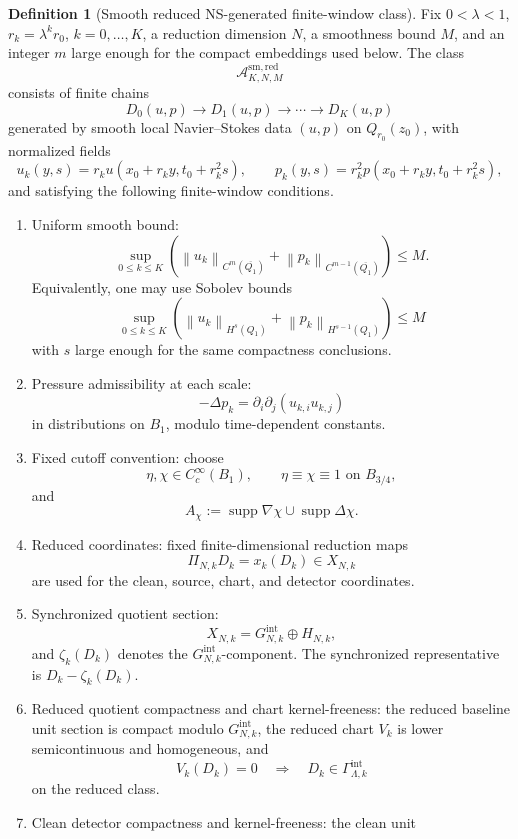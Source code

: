 \documentclass[11pt]{article}
\numberwithin{equation}{section}
\theoremstyle{plain}
\theoremstyle{definition}
\newtheorem{definition}[theorem]{Definition}
\theoremstyle{remark}
\newcommand{\intg}{\mathrm{int}}
\newcommand{\supp}{\operatorname{supp}}
\newcommand{\A}{\mathcal A}
\newcommand{\norm}[1]{\left\lVert #1\right\rVert}
\begin{document}
\begin{definition}[Smooth reduced NS-generated finite-window class]\label{def:smred-class}
Fix \(0<\lambda<1\), \(r_k=\lambda^kr_0\), \(k=0,\dots,K\), a reduction
dimension \(N\), a smoothness bound \(M\), and an integer \(m\) large enough
for the compact embeddings used below.  The class
\[
  \A_{K,N,M}^{\mathrm{sm,red}}
\]
consists of finite chains
\[
  D_0(u,p)\to D_1(u,p)\to\cdots\to D_K(u,p)
\]
generated by smooth local Navier--Stokes data \((u,p)\) on \(Q_{r_0}(z_0)\),
with normalized fields
\[
  u_k(y,s)=r_k u(x_0+r_ky,t_0+r_k^2s),
  \qquad
  p_k(y,s)=r_k^2 p(x_0+r_ky,t_0+r_k^2s),
\]
and satisfying the following finite-window conditions.
\begin{enumerate}[label=(\alph*)]
  \item Uniform smooth bound:
  \[
    \sup_{0\le k\le K}
    \left(
      \norm{u_k}_{C^m(\overline{Q_1})}
      +
      \norm{p_k}_{C^{m-1}(\overline{Q_1})}
    \right)\le M.
  \]
  Equivalently, one may use Sobolev bounds
  \[
    \sup_{0\le k\le K}
    \left(
      \norm{u_k}_{H^s(Q_1)}
      +
      \norm{p_k}_{H^{s-1}(Q_1)}
    \right)\le M
  \]
  with \(s\) large enough for the same compactness conclusions.
  \item Pressure admissibility at each scale:
  \[
    -\Delta p_k=\partial_i\partial_j(u_{k,i}u_{k,j})
  \]
  in distributions on \(B_1\), modulo time-dependent constants.
  \item Fixed cutoff convention: choose
  \[
    \eta,\chi\in C_c^\infty(B_1),
    \qquad
    \eta\equiv\chi\equiv1\text{ on }B_{3/4},
  \]
  and
  \[
    A_\chi:=\supp\nabla\chi\cup\supp\Delta\chi.
  \]
  \item Reduced coordinates: fixed finite-dimensional reduction maps
  \[
    \Pi_{N,k}D_k=x_k(D_k)\in X_{N,k}
  \]
  are used for the clean, source, chart, and detector coordinates.
  \item Synchronized quotient section:
  \[
    X_{N,k}=G_{N,k}^{\intg}\oplus H_{N,k},
  \]
  and \(\zeta_k(D_k)\) denotes the \(G_{N,k}^{\intg}\)-component.  The
  synchronized representative is \(D_k-\zeta_k(D_k)\).
  \item Reduced quotient compactness and chart kernel-freeness: the reduced
  baseline unit section is compact modulo \(G_{N,k}^{\intg}\), the reduced
  chart \(V_k\) is lower semicontinuous and homogeneous, and
  \[
    V_k(D_k)=0
    \quad\Longrightarrow\quad
    D_k\in\Gamma_{\Lambda,k}^{\intg}
  \]
  on the reduced class.
  \item Clean detector compactness and kernel-freeness: the clean unit

\end{enumerate}
\end{definition}
\end{document}

